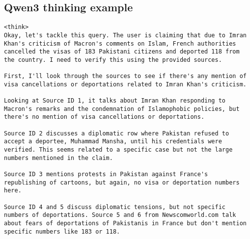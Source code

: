 
\label{appendix_sec:think}


\begin{figure*}
    \section{Qwen3 thinking example}
    \label{appendix_sec:think}
    \begin{lstlisting}[breaklines=true, language={}, frame=single, caption={Qwen3 thinking tokens example.}, label={lst:think}]
<think>
Okay, let's tackle this query. The user is claiming that due to Imran Khan's criticism of Macron's comments on Islam, French authorities cancelled the visas of 183 Pakistani citizens and deported 118 from the country. I need to verify this using the provided sources.

First, I'll look through the sources to see if there's any mention of visa cancellations or deportations related to Imran Khan's criticism. 

Looking at Source ID 1, it talks about Imran Khan responding to Macron's remarks and the condemnation of Islamophobic policies, but there's no mention of visa cancellations or deportations. 

Source ID 2 discusses a diplomatic row where Pakistan refused to accept a deportee, Muhammad Mansha, until his credentials were verified. This seems related to a specific case but not the large numbers mentioned in the claim.

Source ID 3 mentions protests in Pakistan against France's republishing of cartoons, but again, no visa or deportation numbers here.

Source ID 4 and 5 discuss diplomatic tensions, but not specific numbers of deportations. Source 5 and 6 from Newscomworld.com talk about fears of deportations of Pakistanis in France but don't mention specific numbers like 183 or 118.


\end{lstlisting}
\end{figure*}
